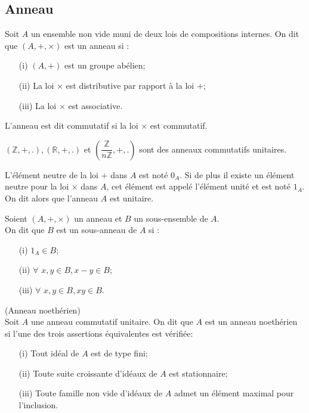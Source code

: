 \subsection{Anneau}
\begin{madefinition}
	Soit $A$ un ensemble non vide muni de deux lois de compositions internes. On dit que $(A, +, \times)$ est un anneau si :
	\begin{enumerate}
		\item[(i)] $(A,+)$ est un groupe abélien;
		\item[(ii)] La loi $\times$ est distributive par rapport à la loi $+$;
		\item[(iii)] La loi $\times$ est associative.
	\end{enumerate}
	L'anneau est dit commutatif si la loi $\times$ est commutatif.
\end{madefinition}
\begin{monexemple}
	$(\mathbb{Z}, +, .), (\mathbb{R}, +, .)$ et $(\dfrac{\mathbb{Z}}{n\mathbb{Z}}, +,.)$ sont des anneaux commutatifs unitaires.
\end{monexemple}
\begin{maremarque}
	L'élément neutre de la loi $+$ dans $A$ est noté $0_A$. Si de plus il existe un élément neutre pour la loi $\times$ dans $A$, cet élément est appelé l'élément unité et est noté $1_A$. On dit alors que l'anneau $A$ est unitaire.
\end{maremarque}
\begin{madefinition}
	Soient $(A, + , \times)$ un anneau et $B$ un sous-ensemble de $A$.\\ On dit que $B$ est un sous-anneau de $A$ si :
	\begin{enumerate}
		\item[(i)] $1_A \in B$;
		\item[(ii)] $\forall$ $x, y \in B, x-y \in B$;
		\item[(iii)] $\forall$ $x, y \in B, xy \in B$.
	\end{enumerate}
\end{madefinition}
\begin{maproposition}
	(Anneau noethérien)\\
	Soit $A$ une anneau commutatif unitaire. On dit que $A$ est un anneau noethérien si l'une des trois assertions équivalentes est vérifiée:
	\begin{enumerate}
		\item[(i)] Tout idéal de $A$ est de type fini;
		\item[(ii)] Toute suite croissante d'idéaux de $A$ est stationnaire;
		\item[(iii)] Toute famille non vide d'idéaux de $A$ admet un élément maximal pour l'inclusion.
	\end{enumerate} 
\end{maproposition}
